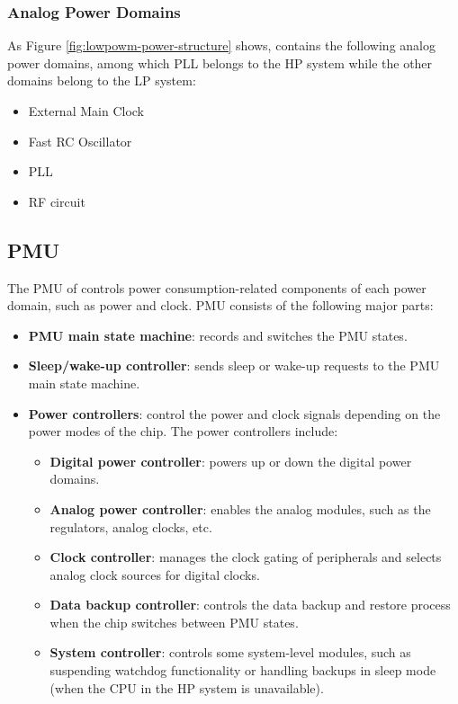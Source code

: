 \documentclass[main\_\_EN.tex]{subfiles}
\begin{document}
\subsubsection{Analog Power Domains}

As Figure \ref{fig:lowpowm-power-structure} shows, \chipname{} contains the following analog power domains, among which PLL belongs to the HP system while the other domains belong to the LP system:

\begin{itemize}
    \item External Main Clock
    \item Fast RC Oscillator
    \item PLL
    \item RF circuit
\end{itemize}

\subsection{PMU}

The PMU of \chipname{} controls power consumption-related components of each power domain, such as power and clock. PMU consists of the following major parts:

\begin{itemize}
    \item \textbf{PMU main state machine}: records and switches the PMU states.
    \item \textbf{Sleep/wake-up controller}: sends sleep or wake-up requests to the PMU main state machine.
    \item \textbf{Power controllers}: control the power and clock signals depending on the power modes of the chip. The power controllers include:
        \begin{itemize}
            \item \textbf{Digital power controller}: powers up or down the digital power domains.
            \item \textbf{Analog power controller}: enables the analog modules, such as the regulators, analog clocks, etc.
            \item \textbf{Clock controller}: manages the clock gating of peripherals and selects analog clock sources for digital clocks.
            \item \textbf{Data backup controller}: controls the data backup and restore process when the chip switches between PMU states.
            \item \textbf{System controller}: controls some system-level modules, such as suspending watchdog functionality or handling backups in sleep mode (when the CPU in the HP system is unavailable).
        \end{itemize}
\end{itemize}
\end{document}
